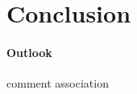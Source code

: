 
\chapter{Conclusion}\label{cha:Conclusion}

\subsubsection{Outlook}\label{sec:Outlook}
comment association